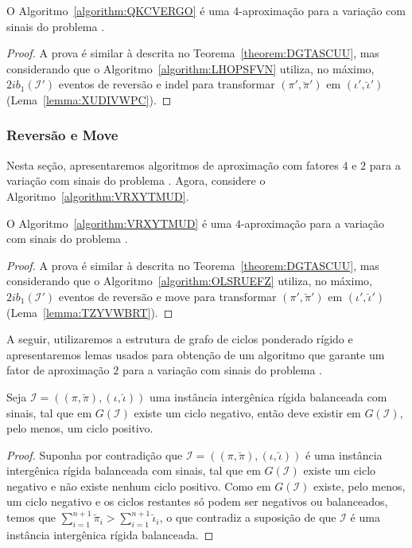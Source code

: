 

\begin{theorem}\label{theorem:CLXFCZMR}
O Algoritmo~\ref{algorithm:QKCVERGO} é uma $4$-aproximação para a variação com sinais do problema \SbIRI{}.
\end{theorem}
\begin{proof}
A prova é similar à descrita no Teorema~\ref{theorem:DGTASCUU}, mas considerando que o Algoritmo~\ref{algorithm:LHOPSFVN} utiliza, no máximo, $2ib_1(\mathcal{I'})$ eventos de reversão e indel para transformar $(\pi',\breve\pi')$ em $(\iota',\breve\iota')$ (Lema~\ref{lemma:XUDIVWPC}).
\end{proof}

\subsubsection{Reversão e Move}

Nesta seção, apresentaremos algoritmos de aproximação com fatores $4$ e $2$ para a variação com sinais do problema \SbIRM{}. Agora, considere o Algoritmo~\ref{algorithm:VRXYTMUD}.



\begin{theorem}\label{theorem:KJSCUFTB}
O Algoritmo~\ref{algorithm:VRXYTMUD} é uma $4$-aproximação para a variação com sinais do problema \SbIRM{}.
\end{theorem}
\begin{proof}
A prova é similar à descrita no Teorema~\ref{theorem:DGTASCUU}, mas considerando que o Algoritmo~\ref{algorithm:OLSRUEFZ} utiliza, no máximo, $2ib_1(\mathcal{I'})$ eventos de reversão e move para transformar $(\pi',\breve\pi')$ em $(\iota',\breve\iota')$ (Lema~\ref{lemma:TZYVWBRT}).
\end{proof}

A seguir, utilizaremos a estrutura de grafo de ciclos ponderado rígido e apresentaremos lemas usados para obtenção de um algoritmo que garante um fator de aproximação $2$ para a variação com sinais do problema \SbIRM{}.

\begin{lemma}\label{lemma:UXFNYAGI}
Seja $\mathcal{I} = ((\pi,\breve\pi),(\iota,\breve\iota))$ uma instância intergênica rígida balanceada com sinais, tal que em $G(\mathcal{I})$ existe um ciclo negativo, então deve existir em $G(\mathcal{I})$, pelo menos, um ciclo positivo.
\end{lemma}
\begin{proof}
Suponha por contradição que $\mathcal{I}=((\pi,\breve\pi),(\iota,\breve\iota))$ é uma instância intergênica rígida balanceada com sinais, tal que em $G(\mathcal{I})$ existe um ciclo negativo e não existe nenhum ciclo positivo. Como em $G(\mathcal{I})$ existe, pelo menos, um ciclo negativo e os ciclos restantes só podem ser negativos ou balanceados, temos que $\sum_{i=1}^{n+1}\breve\pi_i > \sum_{i=1}^{n+1}\breve\iota_i$, o que contradiz a suposição de que $\mathcal{I}$ é uma instância intergênica rígida balanceada.
\end{proof}

